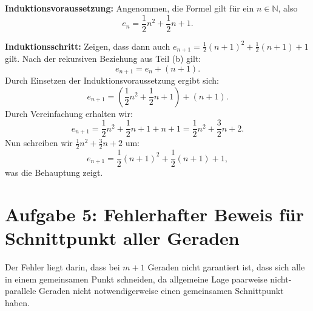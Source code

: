 \documentclass[a4paper]{scrartcl}
\begin{document}
\textbf{Induktionsvoraussetzung:} Angenommen, die Formel gilt für ein \( n \in \mathbb{N} \), also
\[
e_n = \frac{1}{2}n^2 + \frac{1}{2}n + 1.
\]

\textbf{Induktionsschritt:} Zeigen, dass dann auch \( e_{n+1} = \frac{1}{2}(n+1)^2 + \frac{1}{2}(n+1) + 1 \) gilt.
Nach der rekursiven Beziehung aus Teil (b) gilt:
\[
e_{n+1} = e_n + (n+1).
\]
Durch Einsetzen der Induktionsvoraussetzung ergibt sich:
\[
e_{n+1} = \left(\frac{1}{2}n^2 + \frac{1}{2}n + 1\right) + (n+1).
\]
Durch Vereinfachung erhalten wir:
\[
e_{n+1} = \frac{1}{2}n^2 + \frac{1}{2}n + 1 + n + 1 = \frac{1}{2}n^2 + \frac{3}{2}n + 2.
\]
Nun schreiben wir \( \frac{1}{2}n^2 + \frac{3}{2}n + 2 \) um:
\[
e_{n+1} = \frac{1}{2}(n+1)^2 + \frac{1}{2}(n+1) + 1,
\]
was die Behauptung zeigt.

\section*{Aufgabe 5: Fehlerhafter Beweis für Schnittpunkt aller Geraden}
Der Fehler liegt darin, dass bei \( m + 1 \) Geraden nicht garantiert ist, dass sich alle in einem gemeinsamen Punkt schneiden, da allgemeine Lage paarweise nicht-parallele Geraden nicht notwendigerweise einen gemeinsamen Schnittpunkt haben.
\end{document}
